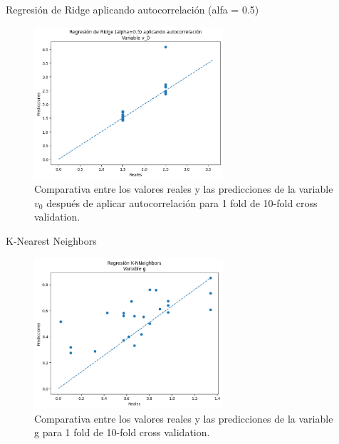 \documentclass{beamer}
\begin{document}
\begin{frame}{Regresión de Ridge aplicando autocorrelación (alfa = 0.5)}
    
\begin{figure}
\centering
\includegraphics[width=7cm]{memoria/images/Regresión de Ridge (alpha=0.5) aplicando autocorrelación Variable v_0.png}
\caption{Comparativa entre los valores reales y las predicciones de la variable $v_0$ después de aplicar autocorrelación para 1 fold de 10-fold cross validation.}
\end{figure}

\end{frame}

\begin{frame}{K-Nearest Neighbors}
    
\begin{figure}
\centering
\includegraphics[width=7cm]{memoria/images/Regresión K-NNeighbors Variable g.png}
\caption{Comparativa entre los valores reales y las predicciones de la variable g para 1 fold de 10-fold cross validation.}
\end{figure}

\end{frame}
\end{document}
